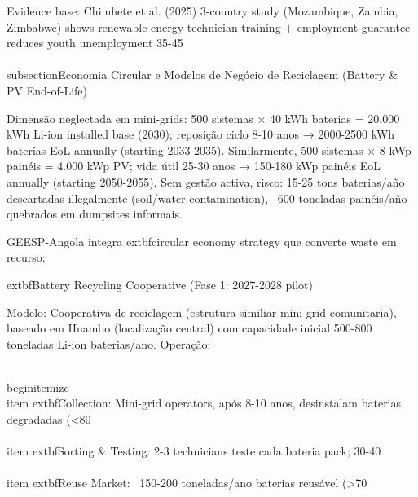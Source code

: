 \documentclass[12pt, a4paper]{article}
\begin{document}
{{{{{{{{{{{{Evidence base: Chimhete et al. (2025) 3-country study (Mozambique, Zambia, Zimbabwe) shows renewable energy technician training + employment guarantee reduces youth unemployment 35-45\\%

\\subsection{Economia Circular e Modelos de Negócio de Reciclagem (Battery & PV End-of-Life)}

Dimensão neglectada em mini-grids: 500 sistemas × 40 kWh baterias = 20.000 kWh Li-ion installed base (2030); reposição ciclo 8-10 anos → 2000-2500 kWh baterias EoL annually (starting 2033-2035). Similarmente, 500 sistemas × 8 kWp painéis = 4.000 kWp PV; vida útil 25-30 anos → 150-180 kWp painéis EoL annually (starting 2050-2055). Sem gestão activa, risco: 15-25 tons baterias/año descartadas illegalmente (soil/water contamination), ~600 toneladas painéis/año quebrados em dumpsites informais.

GEESP-Angola integra 	extbf{circular economy strategy} que converte waste em recurso:

	extbf{Battery Recycling Cooperative (Fase 1: 2027-2028 pilot)}

Modelo: Cooperativa de reciclagem (estrutura similiar mini-grid comunitaria), baseado em Huambo (localização central) com capacidade inicial 500-800 toneladas Li-ion baterias/ano. Operação:

\\begin{itemize}
\\item 	extbf{Collection}: Mini-grid operators, após 8-10 anos, desinstalam baterias degradadas (<80\\%

\\item 	extbf{Sorting & Testing}: 2-3 technicians teste cada bateria pack; 30-40\\%

\\item 	extbf{Reuse Market}: ~150-200 toneladas/ano baterias reusável (>70\\%

}}}}}}}}}}}}
\end{document}
